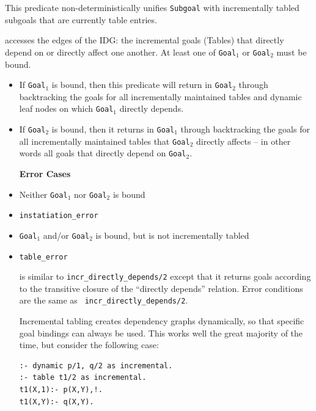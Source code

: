 \begin{description}

%
This predicate non-deterministically unifies {\tt Subgoal} with
incrementally tabled subgoals that are currently table entries.

accesses the edges of the IDG: the incremental goals (Tables) that
directly depend on or directly affect one another.  At least one of
{\tt Goal$_1$} or {\tt Goal$_2$} must be bound.
\begin{itemize}
\item If {\tt Goal$_1$} is bound, then this predicate will return in
  {\tt Goal$_2$} through backtracking the goals for all incrementally
  maintained tables and dynamic leaf nodes on which {\tt Goal$_1$}
  directly depends.
\item If {\tt Goal$_2$} is bound, then it returns in {\tt Goal$_1$}
  through backtracking the goals for all incrementally maintained
  tables that {\tt Goal$_2$} directly affects -- in other words all
  goals that directly depend on {\tt Goal$_2$}.  \ei

{\bf Error Cases}
\bi
\item Neither {\tt Goal$_1$} nor {\tt Goal$_2$} is bound 
\bi
\item 	{\tt instatiation\_error}
\ei
\item {\tt Goal$_1$} and/or {\tt Goal$_2$} is bound, but is not
  incrementally tabled
\bi
\item 	{\tt table\_error}
\ei
\ei

is similar to {\tt incr\_directly\_depends/2} except that it returns
goals according to the transitive closure of the ``directly depends''
relation.  Error conditions are the same as {\tt
  incr\_directly\_depends/2}.

%
Incremental tabling creates dependency graphs dynamically, so that
specific goal bindings can always be used.  This works well the great
majority of the time, but consider the following case:
\begin{verbatim}
:- dynamic p/1, q/2 as incremental.
:- table t1/2 as incremental.
t1(X,1):- p(X,Y),!.
t1(X,Y):- q(X,Y).


\end{verbatim}
\end{itemize}
\end{description}
